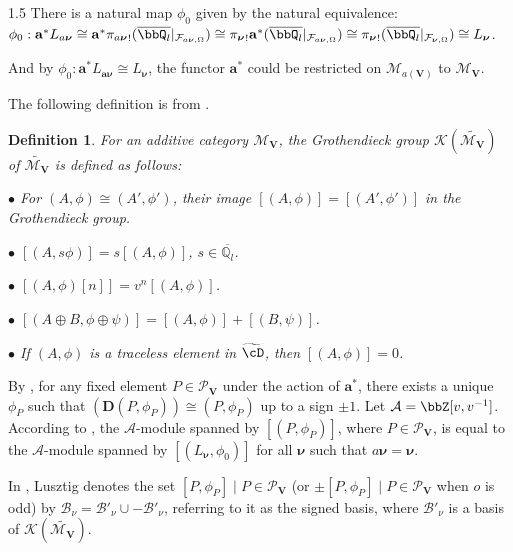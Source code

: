 \documentclass[10pt]{amsart}
\newtheorem{definition}[theorem]{Definition}
\def\bfV{{\mathbf V}}
\def\bfV{\mathbf{V}}
\newcommand\bbq{{\mathbb Q}}
\newcommand\mk{{\mathcal{K}}}
\newcommand\mm{{\mathcal{M}}}
\newcommand\mf{{\mathcal{F}}}
\newcommand\mP{{\mathcal{P}}}
\begin{document}
\begin{spacing}{1.5}
There is a natural map $\phi_0$ given by the natural equivalence: $\phi_0:\mathbf{a}^*L_{a\boldsymbol{\nu}}\cong \mathbf{a}^*{\pi_{a\boldsymbol{\nu}}}_!(\overline{\bbQ_l}|_{\mf_{a\boldsymbol{\nu},\Omega}})\cong {\pi_{\boldsymbol{\nu}}}_!\mathbf{a}^*(\overline{\bbQ_l}|_{\mf_{a\boldsymbol{\nu},\Omega}})\cong {\pi_{\boldsymbol{\nu}}}_!(\overline{\bbQ_l}|_{\mf_{\boldsymbol{\nu},\Omega}})\cong L_{\boldsymbol{\nu}}$.

And by $\phi_0:\mathbf{a}^*L_{\boldsymbol{a\nu}}\cong L_{\boldsymbol{\nu}}$, the functor $\mathbf{a}^*$ could be restricted on $\mm_{a(\bfV)}$ to $\mm_{\bfV}$. 

The following definition is from \cite{lusztig2010introduction}.
\begin{definition}\label{Lusztig d}
    For an additive category $\mm_{\bfV}$, the Grothendieck group $\mk(\widetilde{\mm_{\bfV}})$ of $\widetilde{\mm_{\bfV}}$ is defined as follows:
    
    $\bullet$ For $(A,\phi)\cong (A',\phi')$, their image $[(A,\phi)]=[(A',\phi')]$ in the Grothendieck group.

    $\bullet$ $[(A,s\phi)]=s[(A,\phi)]$, $s\in \overline{\bbq_l}$.

    $\bullet$ $[(A,\phi)[n]]=v^n[(A,\phi)]$.

    $\bullet$ $[(A\oplus B,\phi\oplus \psi)]=[(A,\phi)]+[(B,\psi)]$.

    $\bullet$ If $(A,\phi)$ is a traceless element in $\widetilde{\cD}$, then $[(A,\phi)]=0$.
\end{definition}
By \cite[Proposition 12.5.2]{lusztig2010introduction}, for any fixed element $P \in \mP_{\bfV}$ under the action of $\mathbf{a}^*$, there exists a unique $\phi_P$ such that $(\mathbf{D}(P,\phi_P)) \cong (P,\phi_P)$ up to a sign $\pm1$.
Let $\mathcal{A} = \bbZ[v, v^{-1}]$. According to \cite[Proposition 12.6.3]{lusztig2010introduction}, the $\mathcal{A}$-module spanned by $[(P, \phi_P)]$, where $P \in \mP_{\bfV}$, is equal to the $\mathcal{A}$-module spanned by $[(L_{\boldsymbol{\nu}}, \phi_0)]$ for all $\boldsymbol{\nu}$ such that $a\boldsymbol{\nu} = \boldsymbol{\nu}$.

In \cite[12.6.4]{lusztig2010introduction}, Lusztig denotes the set ${[P, \phi_P] \mid P \in \mP_{\bfV}}$ (or ${\pm[P, \phi_P] \mid P \in \mP_{\bfV}}$ when $o$ is odd) by $\mathcal{B}_{\nu} = \mathcal{B}'_{\nu} \cup -\mathcal{B}'_{\nu}$, referring to it as the signed basis, where $\mathcal{B}'_{\nu}$ is a basis of $\mk(\widetilde{\mm_{\bfV}})$.


\end{spacing}
\end{document}
